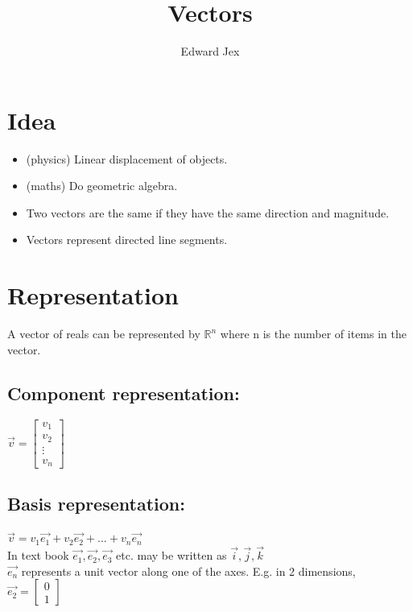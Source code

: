 \documentclass[a4paper,12pt]{article}
\begin{document}
\title{Vectors}	
\author{Edward Jex}
\maketitle

\section*{Idea}
\begin{itemize}
\item (physics) Linear displacement of objects. 
\item (maths) Do geometric algebra.
\item Two vectors are the same if they have the same direction and magnitude. 
\item Vectors represent directed line segments. 
\end{itemize}
\section*{Representation}
A vector of reals can be represented by $\mathbb{R}^n$ where n is the number of items in the vector.
\subsection*{Component representation:}
$ \vec{v} = \begin{bmatrix} v_1 \\ v_2 \\ \vdots \\ v_n \end{bmatrix} $\\
\subsection*{Basis representation:}
$ \vec{v} = v_1 \vec{e_1} + v_2 \vec{e_2} + \dots + v_n \vec{e_n} $ \\
In text book $\vec{e_1}, \vec{e_2}, \vec{e_3} $ etc. may be written as $\vec{i}, \vec{j}, \vec{k}$ \\
$\vec{e_n}$ represents a unit vector along one of the axes. E.g. in 2 dimensions, $\vec{e_2} = \begin{bmatrix} 0 \\ 1 \end{bmatrix} $
\end{document}
